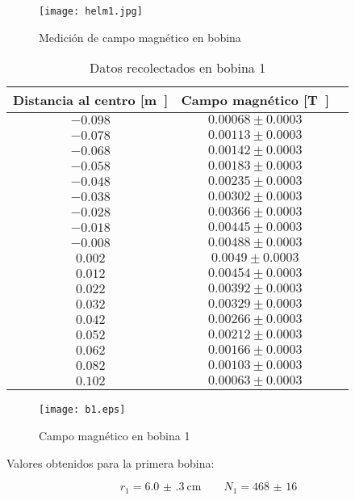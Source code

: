 \documentclass[12pt,a4paper]{article}
\begin{document}
\begin{figure}[H]
  \centering
   \texttt{[image: helm1.jpg]}
\caption{Medición de campo magnético en bobina}
  \label{fig:ejemplo}
\end{figure}



\begin{table}[H]
 \centering
 \begin{tabular}{|c|c|c}
Distancia al centro [\si\meter] & Campo magnético [\si\tesla] \\
\hline
$ -0.098 $ & $ 0.00068 \pm 0.0003 $ \\
$ -0.078 $ & $ 0.00113 \pm 0.0003 $ \\
$ -0.068 $ & $ 0.00142 \pm 0.0003 $ \\
$ -0.058 $ & $ 0.00183 \pm 0.0003 $ \\ 
$ -0.048 $ & $ 0.00235 \pm 0.0003 $ \\
$ -0.038 $ & $ 0.00302 \pm 0.0003 $ \\ 
$ -0.028 $ & $ 0.00366 \pm 0.0003 $ \\ 
$ -0.018 $ & $ 0.00445 \pm 0.0003 $ \\ 
$ -0.008 $ & $ 0.00488 \pm 0.0003 $ \\ 
$ 0.002 $ & $ 0.0049 \pm 0.0003 $ \\ 
$ 0.012 $ & $ 0.00454 \pm 0.0003 $ \\ 
$ 0.022 $ & $ 0.00392 \pm 0.0003 $ \\ 
$ 0.032 $ & $ 0.00329 \pm 0.0003 $ \\ 
$ 0.042 $ & $ 0.00266 \pm 0.0003 $ \\ 
$ 0.052 $ & $ 0.00212 \pm 0.0003 $ \\ 
$ 0.062 $ & $ 0.00166 \pm 0.0003 $ \\ 
$ 0.082 $ & $ 0.00103 \pm 0.0003 $ \\ 
$ 0.102 $ & $ 0.00063 \pm 0.0003 $ \\ 
 \end{tabular}
\caption{Datos recolectados en bobina 1} 
 \end{table}


\begin{figure}[H]
  \centering
   \texttt{[image: b1.eps]}
\caption{Campo magnético en bobina 1}
  \label{b1plot}
\end{figure}

Valores obtenidos para la primera bobina:

$$r_1 = \SI{6.0(3)}{\centi\meter} \qquad N_1 = \SI{468(16)}{} $$
\end{document}
